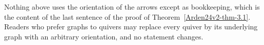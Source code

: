 \begin{remark}\label{Arden24v2-rem-4.1}
\label{Arden24v2-rem:orientation}
Nothing above uses the orientation of the arrows except as bookkeeping, which is the content of the last sentence of the proof of Theorem~\ref{Arden24v2-thm-3.1}. Readers who prefer graphs to quivers may replace every quiver by its underlying graph with an arbitrary orientation, and no statement changes.
\end{remark}